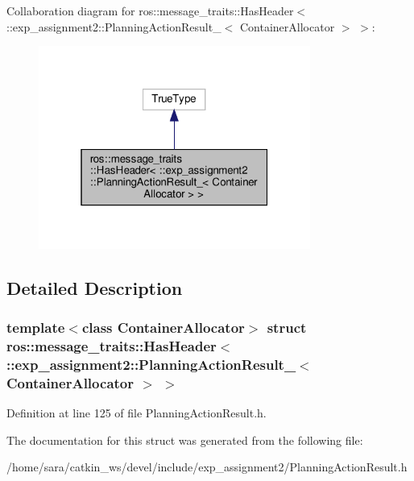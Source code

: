 Collaboration diagram for ros\+:\+:message\+\_\+traits\+:\+:Has\+Header$<$ \+:\+:exp\+\_\+assignment2\+:\+:Planning\+Action\+Result\+\_\+$<$ Container\+Allocator $>$ $>$\+:
\nopagebreak
\begin{figure}[H]
\begin{center}
\leavevmode
\includegraphics[width=253pt]{structros_1_1message__traits_1_1HasHeader_3_01_1_1exp__assignment2_1_1PlanningActionResult___3_01284d2c18078e238d8d14c660a86afe2}
\end{center}
\end{figure}


\subsection{Detailed Description}
\subsubsection*{template$<$class Container\+Allocator$>$\newline
struct ros\+::message\+\_\+traits\+::\+Has\+Header$<$ \+::exp\+\_\+assignment2\+::\+Planning\+Action\+Result\+\_\+$<$ Container\+Allocator $>$ $>$}



Definition at line 125 of file Planning\+Action\+Result.\+h.



The documentation for this struct was generated from the following file\+:\begin{DoxyCompactItemize}
\item 
/home/sara/catkin\+\_\+ws/devel/include/exp\+\_\+assignment2/Planning\+Action\+Result.\+h\end{DoxyCompactItemize}
